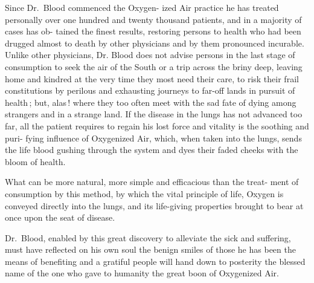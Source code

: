 \documentclass[10pt]{article}
\begin{document}
\begin{multicols}{3}
	Since Dr.~Blood commenced the Oxygen-\linebreak
	ized Air practice he has treated personally\linebreak
	over one hundred and twenty thousand\linebreak
	patients, and in a majority of cases has ob-\linebreak
	tained the finest results, restoring persons to\linebreak
	health who had been drugged almost to death\linebreak
	by other physicians and by them pronounced\linebreak
	incurable. Unlike other physicians, Dr.\linebreak
	Blood does not advise persons in the last\linebreak
	stage of consumption to seek the air of the\linebreak
	South or a trip across the briny deep, leaving\linebreak
	home and kindred at the very time they most\linebreak
	need their care, to risk their frail constitutions\linebreak
	by perilous and exhausting journeys to far-off\linebreak
	lands in pursuit of health\,; but, alas\,! where\linebreak
	they too often meet with the sad fate of dying\linebreak
	among strangers and in a strange land. If\linebreak
	the disease in the lungs has not advanced too\linebreak
	far, all the patient requires to regain his lost\linebreak
	force and vitality is the soothing and puri-\linebreak
	fying influence of Oxygenized Air, which,\linebreak
	when taken into the lungs, sends the life\linebreak
	blood gushing through the system and dyes their faded cheeks with the\linebreak
	bloom of health.

	What can be more natural, more simple and efficacious than the treat-\linebreak
	ment of consumption by this method, by which the vital principle of life,\linebreak
	Oxygen is conveyed directly into the lungs, and its life-giving properties\linebreak
	brought to bear at once upon the seat of disease.

	Dr.~Blood, enabled by this great discovery to alleviate the sick and\linebreak
	suffering, must have reflected on his own soul the benign smiles of those he\linebreak
	has been the means of benefiting and a gratiful people will hand down to\linebreak
	posterity the blessed name of the one who gave to humanity the great\linebreak
	boon of Oxygenized Air.
\end{multicols}
\end{document}
